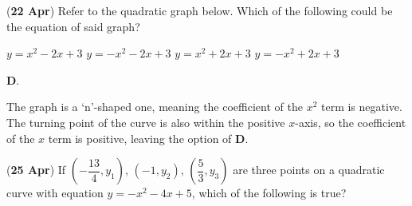 \documentclass[12pt, answers]{exam}
\renewcommand{\frac}[2]{\dfrac{#1}{#2}}
\begin{document}
\begin{questions}
	\question (\textbf{22 Apr}) Refer to the quadratic graph below.
	Which of the following could be the equation of said graph?
	\begin{figure}[htpb]
		\centering
		\label{fig:0422}
	\end{figure}
	\begin{choices}
		\choice \(y = x^{2} - 2x + 3\)
		\choice \(y = -x^{2} - 2x + 3\)
		\choice \(y = x^{2} + 2x + 3\)
		\choice \(y = -x^{2} + 2x + 3\)
	\end{choices}
	\begin{solution}
		\textbf{D}.

		The graph is a `n'-shaped one, meaning the coefficient of the \(x^{2}\) term is negative.
		The turning point of the curve is also within the positive \(x\)-axis, so the coefficient
		of the \(x\) term is positive, leaving the option of \textbf{D}.
	\end{solution}

	\question (\textbf{25 Apr}) If \(\left(-\frac{13}{4}, y_{1}\right)\), \(\left(-1, y_{2}\right)\), \(\left(\frac{5}{3}, y_{3}\right)\)
	are three points on a quadratic curve with equation \(y = -x^{2} - 4x + 5\),
	which of the following is true?


\end{questions}
\end{document}
